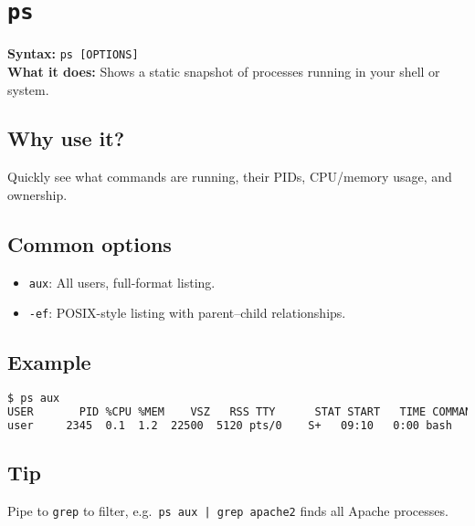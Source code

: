\documentclass[10pt,oneside]{scrbook}
\begin{document}
\section{\texttt{ps}}
\begin{cmdbox}
  \textbf{Syntax:} \lstinline!ps [OPTIONS]! \\
  \textbf{What it does:} Shows a static snapshot of processes running in your shell or system.
\end{cmdbox}
\begin{commanddetails}
  \subsection*{Why use it?}
    Quickly see what commands are running, their PIDs, CPU/memory usage, and ownership.

  \subsection*{Common options}
    \begin{itemize}
      \item \lstinline!aux!: All users, full-format listing.
      \item \lstinline!-ef!: POSIX-style listing with parent–child relationships.
    \end{itemize}

  \subsection*{Example}
  \begin{lstlisting}[language=bash]
$ ps aux
USER       PID %CPU %MEM    VSZ   RSS TTY      STAT START   TIME COMMAND
user     2345  0.1  1.2  22500  5120 pts/0    S+   09:10   0:00 bash
  \end{lstlisting}

  \subsection*{Tip}
    Pipe to \lstinline!grep! to filter, e.g.\  
    \lstinline!ps aux | grep apache2! finds all Apache processes.
\end{commanddetails}

\end{document}
